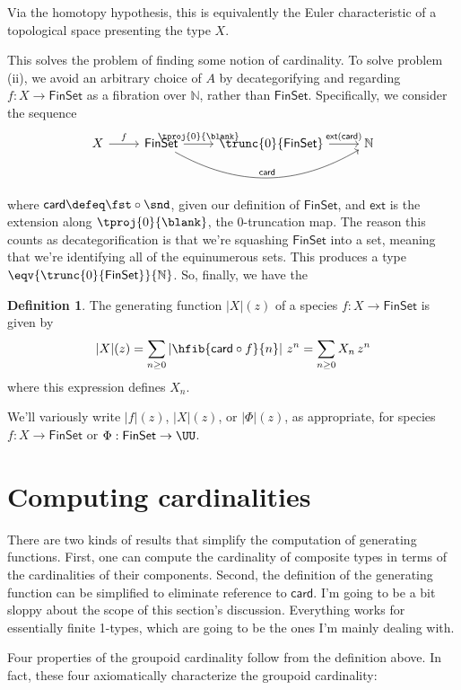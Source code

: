 \documentclass[fleqn]{article}
\newcommand{\card}{\mathsf{card}}
\newcommand{\gf}[1]{\abs{#1}\!(z)}
\newcommand{\finset}{\mathsf{FinSet}}
\newcommand{\abs}[1]{\left\lvert #1 \right\rvert}
\theoremstyle{theorem}
\theoremstyle{definition}
\newtheorem{defn}{Definition}[section]
\begin{document}
\noindent
Via the homotopy hypothesis, this is equivalently the Euler characteristic of
a topological space presenting the type $X$.

This solves the problem of finding some notion of cardinality.  To solve
problem (ii), we avoid an arbitrary choice of $A$ by decategorifying and
regarding $f : X \to \finset$ as a fibration over $\mathbb{N}$, rather than
$\finset$.  Specifically, we consider the sequence
\[ \begin{tikzcd}
    X \ar[r, "f"] & 
    \finset \ar[r, "\tproj{0}{\blank}"] \ar[rr, bend right, "\card"] &
    \trunc{0}{\finset} \ar[r, "\mathsf{ext}(\card)"] &
    \mathbb{N}
\end{tikzcd}  \]
where $\card \defeq \fst \circ \snd$, given our definition of $\finset$, and
$\mathsf{ext}$ is the extension along $\tproj{0}{\blank}$, the $0$-truncation
map.  The reason this counts as decategorification is that we're squashing
$\finset$ into a set, meaning that we're identifying all of the equinumerous
sets.  This produces a type $\eqv{\trunc{0}{\finset}}{\mathbb{N}}$.  So,
finally, we have the
\begin{defn}
  The generating function $\gf{X}$ of a species $f : X \to \finset$ is given by
  \[
    \gf{X}
    =
    \sum_{n\geq0}
    \abs{\hfib{\card \circ f}{n}}\,
    z^{n}
    =
    \sum_{n\geq0}
    X_{n}\, z^{n}
  \]
  where this expression defines $X_{n}$.
\end{defn}
\noindent
We'll variously write $\gf{f}$, $\gf{X}$, or $\gf{\Phi}$, as appropriate, for
species $f : X \to \finset$ or $\Phi : \finset \to \UU$.


\section{Computing cardinalities}

There are two kinds of results that simplify the computation of generating
functions.  First, one can compute the cardinality of composite types in terms
of the cardinalities of their components.  Second, the definition of the
generating function can be simplified to eliminate reference to $\card$.  I'm
going to be a bit sloppy about the scope of this section's discussion.
Everything works for essentially finite 1-types, which are going to be the ones
I'm mainly dealing with.

Four properties of the groupoid cardinality follow from the definition above.
In fact, these four axiomatically characterize the groupoid cardinality:
\end{document}
